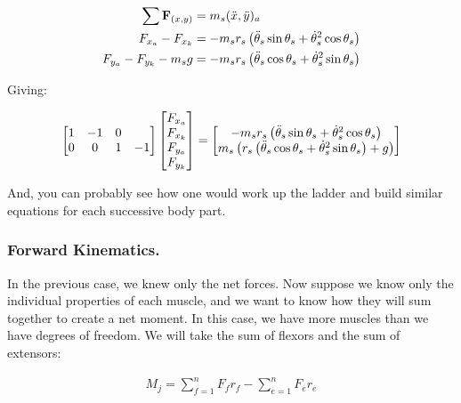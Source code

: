 \begin{equation}
\begin{split}
    \sum \mathbf{F}_{(x,y)} &= m_s (\Ddot{x},\Ddot{y})_a \\
    F_{x_a} - F_{x_k} &= - m_sr_s\left(\Ddot{\theta}_s\sin\theta_s + \dot{\theta}_s^2\cos\theta_s\right) \\
    F_{y_a} - F_{y_k} - m_sg &= - m_sr_s\left(\Ddot{\theta}_s\cos\theta_s + \dot{\theta}_s^2\sin\theta_s\right)
\end{split}
\end{equation}

Giving: 

\begin{align}
\begin{bmatrix}
    1 & -1 & 0 & \\
    0 & 0 & 1 & -1
\end{bmatrix}
\begin{bmatrix}
    F_{x_a} \\
    F_{x_k} \\
    F_{y_a} \\
    F_{y_k} 
\end{bmatrix}
= 
\begin{bmatrix}
    - m_sr_s\left(\Ddot{\theta}_s\sin\theta_s + \dot{\theta}_s^2\cos\theta_s\right) \\
    m_s\left(r_s\left(\Ddot{\theta}_s\cos\theta_s + \dot{\theta}_s^2\sin\theta_s\right) + g\right)
\end{bmatrix}
\end{align}

And, you can probably see how one would work up the ladder and build similar equations for each successive body part. 

\subsubsection{Forward Kinematics.}


In the previous case, we knew only the net forces. Now suppose we know only the individual properties of each muscle, and we want to know how they will sum together to create a net moment. In this case, we have more muscles than we have degrees of freedom. We will take the sum of flexors and the sum of extensors: 

\begin{equation}
\begin{split}
    M_j = \sum^n_{f=1} F_fr_f - \sum^n_{e=1} F_er_e
\end{split}
\end{equation}

